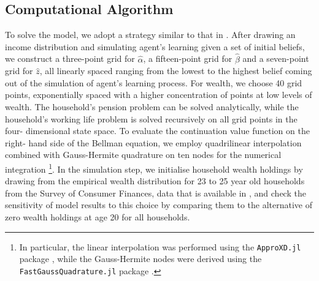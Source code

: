 \subsection{Computational Algorithm}
To solve the model, we adopt a strategy similar to that in \citet{GuvenenSmith2014}.
After drawing an income distribution and simulating agent's learning given a set
of initial beliefs, we construct a three-point grid for $\hat{\alpha}$, a 
fifteen-point grid for $\hat{\beta}$ and a seven-point grid for $\hat{z}$, all
linearly spaced ranging from the lowest to the highest belief coming out of the
simulation of agent's learning process. For wealth, we choose 40 grid points, 
exponentially spaced with a higher concentration of points at low levels of wealth.
The household's pension problem can be solved analytically, while the household's 
working life problem is solved recursively on all grid points in the four-
dimensional state space. To evaluate the continuation value function on the right-
hand side of the Bellman equation, we employ quadrilinear interpolation combined
with Gauss-Hermite quadrature on ten nodes for the numerical integration
\footnote{In particular, the linear interpolation was performed using the 
\texttt{ApproXD.jl} package \citep{Oswald2014}, while the Gauss-Hermite nodes
were derived using the \texttt{FastGaussQuadrature.jl} package \citep{Townsend2015}.}. In the
simulation step, we initialise household wealth holdings by drawing from the empirical 
wealth distribution for 23 to 25 year old households from the Survey of Consumer
Finances, data that is available in \cite{HintermaierKoeniger2011}, and check 
the sensitivity of model results to this choice by comparing them to the 
alternative of zero wealth holdings at age 20 for all households. 


\pagebreak
